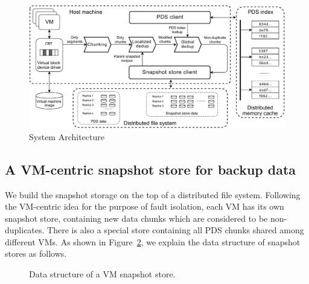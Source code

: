 \begin{figure}[t]
    \centering
    \includegraphics[width=6in]{images/socc_arch_cluster}
    \caption{System Architecture}
    \label{fig:arch_vm}
\end{figure}

\subsection{A VM-centric snapshot store for backup data}
\label{sect:store}
We build the snapshot storage on the top of a distributed file system.
Following the VM-centric idea for the purpose of fault isolation,
each VM has its own snapshot store, containing new data chunks which are considered
to be non-duplicates.
There is also a special store containing all PDS chunks shared among different VMs.
As shown in Figure~\ref{fig:as_arch}, we explain the data structure of snapshot stores as follows.
\begin{figure}[htbp]
  \centering
  \caption{Data structure of a VM snapshot store.}
  \label{fig:as_arch}
\end{figure}

